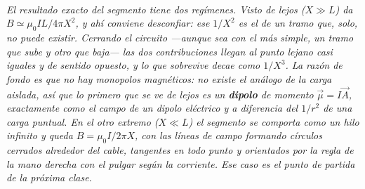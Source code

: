 \begin{center}
\\[0.5em]
{\small\itshape El resultado exacto del segmento tiene dos regímenes. Visto de
lejos ($X\gg L$) da $B\simeq\mu_0 IL/4\pi X^2$, y ahí conviene desconfiar: ese
$1/X^2$ es el de un tramo que, solo, no puede existir. Cerrando el circuito
---aunque sea con el más simple, un tramo que sube y otro que baja--- las dos
contribuciones llegan al punto lejano casi iguales y de sentido opuesto, y lo
que sobrevive decae como $1/X^3$. La razón de fondo es que no hay monopolos
magnéticos: no existe el análogo de la carga aislada, así que lo primero que se
ve de lejos es un \textbf{dipolo} de momento $\vec\mu = I\vec A$, exactamente
como el campo de un dipolo eléctrico y a diferencia del $1/r^2$ de una carga
puntual. En el otro extremo ($X\ll L$) el segmento se comporta como un hilo
infinito y queda $B=\mu_0 I/2\pi X$, con las líneas de campo formando círculos
cerrados alrededor del cable, tangentes en todo punto y orientados por la regla
de la mano derecha con el pulgar según la corriente. Ese caso es el punto de
partida de la próxima clase.}
\end{center}
